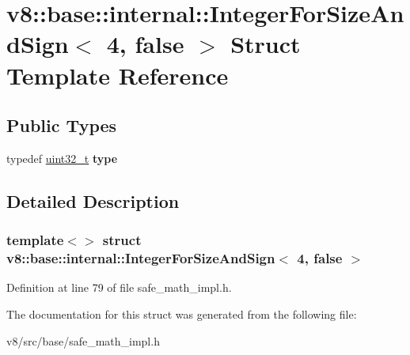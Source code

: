 \hypertarget{structv8_1_1base_1_1internal_1_1IntegerForSizeAndSign_3_014_00_01false_01_4}{}\section{v8\+:\+:base\+:\+:internal\+:\+:Integer\+For\+Size\+And\+Sign$<$ 4, false $>$ Struct Template Reference}
\label{structv8_1_1base_1_1internal_1_1IntegerForSizeAndSign_3_014_00_01false_01_4}
\subsection*{Public Types}
\begin{DoxyCompactItemize}
\item 
\mbox{\label{structv8_1_1base_1_1internal_1_1IntegerForSizeAndSign_3_014_00_01false_01_4_a624902243bda9245b6b41eae21c28367}} 
typedef \mbox{\hyperlink{classuint32__t}{uint32\+\_\+t}} {\bfseries type}
\end{DoxyCompactItemize}


\subsection{Detailed Description}
\subsubsection*{template$<$$>$\newline
struct v8\+::base\+::internal\+::\+Integer\+For\+Size\+And\+Sign$<$ 4, false $>$}



Definition at line 79 of file safe\+\_\+math\+\_\+impl.\+h.



The documentation for this struct was generated from the following file\+:\begin{DoxyCompactItemize}
\item 
v8/src/base/safe\+\_\+math\+\_\+impl.\+h\end{DoxyCompactItemize}
